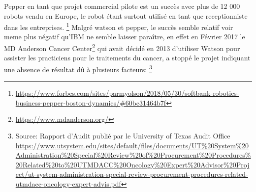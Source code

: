 Pepper en tant que projet commercial pilote est un succès avec plus de 12 000 robots vendu en 
Europe, le robot étant surtout utilisé en tant que receptionniste dans les entreprises.
\footnote{\url{https://www.forbes.com/sites/parmyolson/2018/05/30/softbank-robotics-business-pepper-boston-dynamics/\#60bc31464b7f}}
\newline
Malgré watson et pepper, le succès semble relatif voir meme plus négatif qu'IBM ne semble laisser paraître,
en effet en Février 2017 le MD Anderson Cancer Center\footnote{\url{https://www.mdanderson.org/}}
qui avait décidé en 2013 d'utiliser Watson pour assister les practiciens pour le traitements 
du cancer, a stoppé le projet indiquant une absence de résultat dû à plusieurs facteurs:
\footnote{Source: Rapport d'Audit publié par le University of Texas Audit Office
    \url{https://www.utsystem.edu/sites/default/files/documents/UT\%20System\%20Administration\%20Special\%20Review\%20of\%20Procurement\%20Procedures\%20Related\%20to\%20UTMDACC\%20Oncology\%20Expert\%20Advisor\%20Project/ut-system-administration-special-review-procurement-procedures-related-utmdacc-oncology-expert-advis.pdf}}
\newline

